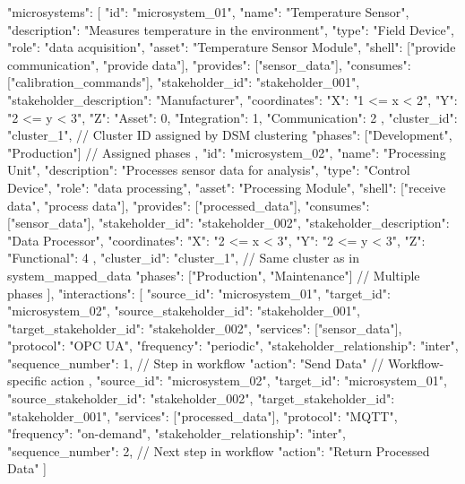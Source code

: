{
  "microsystems": [
    {
      "id": "microsystem_01",
      "name": "Temperature Sensor",
      "description": "Measures temperature in the environment",
      "type": "Field Device",
      "role": "data acquisition",
      "asset": "Temperature Sensor Module",
      "shell": ["provide communication", "provide data"],
      "provides": ["sensor_data"],
      "consumes": ["calibration_commands"],
      "stakeholder_id": "stakeholder_001",
      "stakeholder_description": "Manufacturer",
      "coordinates": {
        "X": "1 <= x < 2",
        "Y": "2 <= y < 3",
        "Z": {
          "Asset": 0,
          "Integration": 1,
          "Communication": 2
        }
      },
      "cluster_id": "cluster_1",  // Cluster ID assigned by DSM clustering
      "phases": ["Development", "Production"]  // Assigned phases
    },
    {
      "id": "microsystem_02",
      "name": "Processing Unit",
      "description": "Processes sensor data for analysis",
      "type": "Control Device",
      "role": "data processing",
      "asset": "Processing Module",
      "shell": ["receive data", "process data"],
      "provides": ["processed_data"],
      "consumes": ["sensor_data"],
      "stakeholder_id": "stakeholder_002",
      "stakeholder_description": "Data Processor",
      "coordinates": {
        "X": "2 <= x < 3",
        "Y": "2 <= y < 3",
        "Z": {
          "Functional": 4
        }
      },
      "cluster_id": "cluster_1",  // Same cluster as in system_mapped_data
      "phases": ["Production", "Maintenance"]  // Multiple phases
    }
  ],
  "interactions": [
    {
      "source_id": "microsystem_01",
      "target_id": "microsystem_02",
      "source_stakeholder_id": "stakeholder_001",
      "target_stakeholder_id": "stakeholder_002",
      "services": ["sensor_data"],
      "protocol": "OPC UA",
      "frequency": "periodic",
      "stakeholder_relationship": "inter",
      "sequence_number": 1,  // Step in workflow
      "action": "Send Data"  // Workflow-specific action
    },
    {
      "source_id": "microsystem_02",
      "target_id": "microsystem_01",
      "source_stakeholder_id": "stakeholder_002",
      "target_stakeholder_id": "stakeholder_001",
      "services": ["processed_data"],
      "protocol": "MQTT",
      "frequency": "on-demand",
      "stakeholder_relationship": "inter",
      "sequence_number": 2,  // Next step in workflow
      "action": "Return Processed Data"
    }
  ]
}